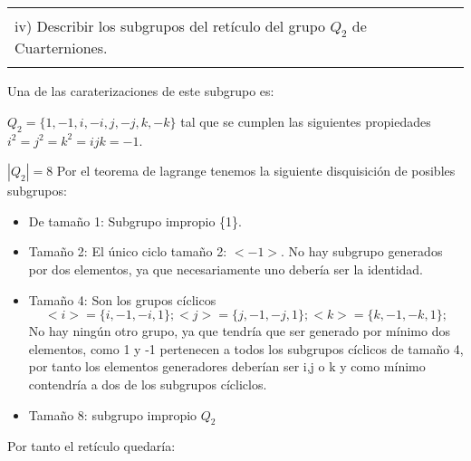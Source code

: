 \documentclass[12pt]{article}
\newenvironment{micaja}
{
    \begin{center}
    \begin{tabular}{|p{0.9\textwidth}|}
    \hline\\
    }   
    {   
    \\\\\hline
    \end{tabular} 
    \end{center}
    }
\begin{document}
\begin{micaja}
    iv) Describir los subgrupos del retículo del grupo $Q_2$ de Cuarterniones. 
\end{micaja}  

Una de las caraterizaciones de este subgrupo es: 

$Q_2 = \{ 1,-1,i,-i,j,-j, k, -k \}$ tal que se cumplen las siguientes propiedades
$i^2 = j^2 = k^2 = ijk = -1$.

$|Q_2|=8$ Por el teorema de lagrange tenemos la siguiente disquisición de  posibles subgrupos:

\begin{itemize}
    \item De tamaño 1: Subgrupo impropio \{1\}.
    \item Tamaño 2: El único ciclo tamaño 2: $<-1>$. No hay subgrupo 
    generados por dos elementos, ya que necesariamente uno debería ser la identidad.
    \item Tamaño 4: Son los grupos cíclicos  
    $$<i>=\{i,-1,-i, 1\}; <j> = \{ j,-1,-j, 1\}; <k>=\{ k,-1,-k,1\};$$
    No hay ningún otro grupo, ya que tendría que ser generado por mínimo dos elementos,
    como 1 y -1 pertenecen a todos los subgrupos cíclicos de tamaño 4, por tanto los elementos 
    generadores deberían ser i,j o k y como mínimo
    contendría a dos de los subgrupos cícliclos.
    \item  Tamaño 8: subgrupo impropio $Q_2$ 
\end{itemize}

Por tanto el retículo quedaría: 

\end{document}
